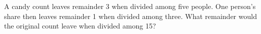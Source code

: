 A candy count leaves remainder 3 when divided among five people. One person's share then leaves remainder 1 when divided among three. What remainder would the original count leave when divided among 15?
